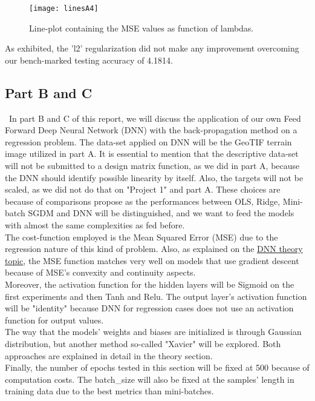 \begin{figure}[H]
\label{fig:figA9}
\centering
\texttt{[image: linesA4]}
\caption{Line-plot containing the MSE values as function of lambdas.}
\end{figure}

As exhibited, the 'l2' regularization did not make any improvement overcoming our bench-marked testing accuracy of 4.1814.

\subsection{Part B and C}
\label{chap:Part B and C}

\qquad \, In part B and C of this report, we will discuss the application of our own Feed Forward Deep Neural Network (DNN) with the back-propagation method on a regression problem. The data-set applied on DNN will be the GeoTIF terrain image utilized in part A. It is essential to mention that the descriptive data-set will not be submitted to a design matrix function, as we did in part A, because the DNN should identify possible linearity by itself. Also, the targets will not be scaled, as we did not do that on "Project 1" and part A. These choices are because of comparisons propose as the performances between OLS, Ridge, Mini-batch SGDM and DNN will be distinguished, and we want to feed the models with almost the same complexities as fed before.\\

The cost-function employed is the Mean Squared Error (MSE) due to the regression nature of this kind of problem. Also, as explained on the \hyperref[chap:Deep Neural Networks]{DNN theory topic}, the MSE function matches very well on models that use gradient descent because of MSE's convexity and continuity aspects.\\

Moreover, the activation function for the hidden layers will be Sigmoid on the first experiments and then Tanh and Relu. The output layer's activation function will be "identity" because DNN for regression cases does not use an activation function for output values.\\

The way that the models' weights and biases are initialized is through Gaussian distribution, but another method so-called "Xavier" will be explored. Both approaches are explained in detail in the theory section.\\

Finally, the number of epochs tested in this section will be fixed at 500 because of computation costs. The batch\_size will also be fixed at the samples' length in training data due to the best metrics than mini-batches.


